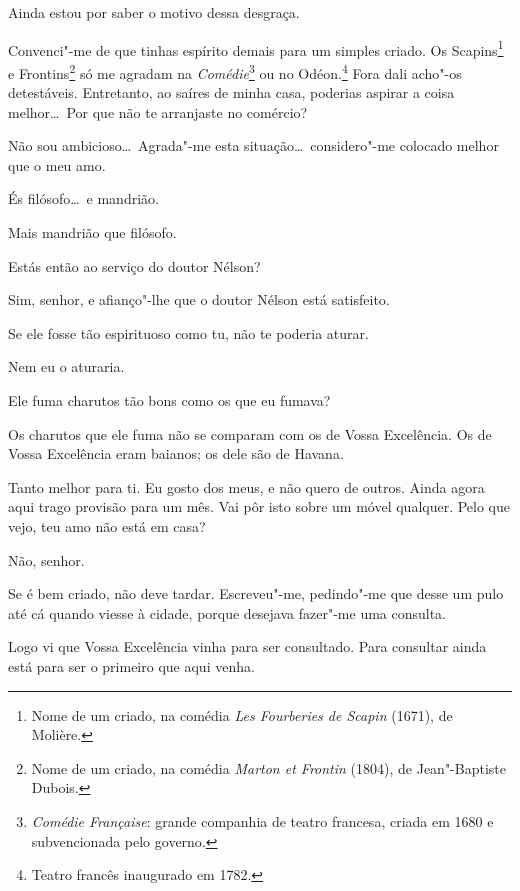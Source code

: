   Ainda estou por saber o motivo dessa desgraça.

  Convenci"-me de que tinhas espírito demais para um
simples criado. Os Scapins\footnote{ Nome de um criado, na comédia \textit{Les Fourberies de Scapin} (1671), de Molière.} 
e Frontins\footnote{ Nome de um criado, na comédia \textit{Marton et Frontin} (1804), de Jean"-Baptiste Dubois.} 
só me agradam na \textit{Comédie}\footnote{ \textit{Comédie Française}: 
grande companhia de teatro francesa, criada em 1680 e subvencionada pelo governo.}
ou no Odéon.\footnote{
Teatro francês inaugurado em 1782.}
Fora dali acho"-os detestáveis. Entretanto, ao saíres de
minha casa, poderias aspirar a coisa melhor\ldots\ Por que não te
arranjaste no comércio?

  Não sou ambicioso\ldots\ Agrada"-me esta situação\ldots\ considero"-me
colocado melhor que o meu amo.

  És filósofo\ldots\ e mandrião.

  Mais mandrião que filósofo.

  Estás então ao serviço do doutor Nélson?

  Sim, senhor, e afianço"-lhe que o doutor Nélson está satisfeito.

  Se ele fosse tão espirituoso como tu, não te
poderia aturar.

  Nem eu o aturaria.

  Ele fuma charutos tão bons como os que eu fumava?

  Os charutos que ele fuma não se comparam com os de Vossa
Excelência. Os de Vossa Excelência eram baianos; os dele são de Havana.

  Tanto melhor para ti. Eu gosto dos meus, e não
quero de outros.  Ainda agora aqui trago
provisão para um mês.  Vai pôr isto sobre um
móvel qualquer.  Pelo que vejo, teu amo não está em casa?

  Não, senhor.

  Se é bem criado, não deve tardar. Escreveu"-me,
pedindo"-me que desse um pulo até cá quando viesse à cidade, porque
desejava fazer"-me uma consulta.

  Logo vi que Vossa Excelência vinha para ser consultado.
Para consultar ainda está para ser o primeiro que aqui venha.

